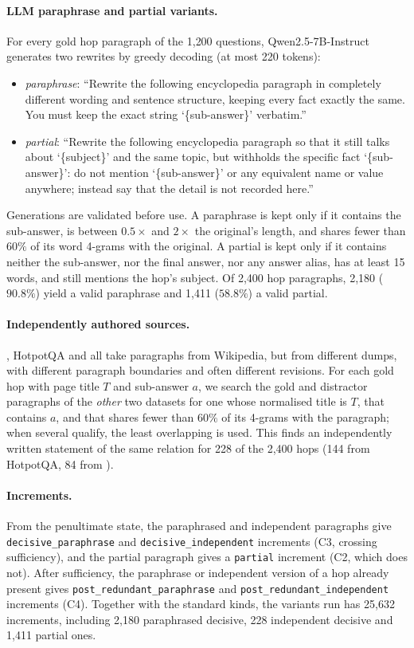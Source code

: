 \paragraph{LLM paraphrase and partial variants.} For every gold hop paragraph of the 1{,}200 questions, Qwen2.5-7B-Instruct generates two rewrites by greedy decoding (at most 220 tokens):
\begin{itemize}
  \item \emph{paraphrase}: ``Rewrite the following encyclopedia paragraph in completely different wording and sentence structure, keeping every fact exactly the same. You must keep the exact string `\{sub-answer\}' verbatim.''
  \item \emph{partial}: ``Rewrite the following encyclopedia paragraph so that it still talks about `\{subject\}' and the same topic, but withholds the specific fact `\{sub-answer\}': do not mention `\{sub-answer\}' or any equivalent name or value anywhere; instead say that the detail is not recorded here.''
\end{itemize}
Generations are validated before use. A paraphrase is kept only if it contains the sub-answer, is between $0.5\times$ and $2\times$ the original's length, and shares fewer than $60\%$ of its word 4-grams with the original. A partial is kept only if it contains neither the sub-answer, nor the final answer, nor any answer alias, has at least 15 words, and still mentions the hop's subject. Of 2{,}400 hop paragraphs, 2{,}180 ($90.8\%$) yield a valid paraphrase and 1{,}411 ($58.8\%$) a valid partial.

\paragraph{Independently authored sources.} \musique{}, HotpotQA and \twowiki{} all take paragraphs from Wikipedia, but from different dumps, with different paragraph boundaries and often different revisions. For each \musique{} gold hop with page title $T$ and sub-answer $a$, we search the gold and distractor paragraphs of the \emph{other} two datasets for one whose normalised title is $T$, that contains $a$, and that shares fewer than $60\%$ of its 4-grams with the \musique{} paragraph; when several qualify, the least overlapping is used. This finds an independently written statement of the same relation for 228 of the 2{,}400 hops (144 from HotpotQA, 84 from \twowiki{}).

\paragraph{Increments.} From the penultimate state, the paraphrased and independent paragraphs give \texttt{decisive\_paraphrase} and \texttt{decisive\_independent} increments (C3, crossing sufficiency), and the partial paragraph gives a \texttt{partial} increment (C2, which does not). After sufficiency, the paraphrase or independent version of a hop already present gives \texttt{post\_redundant\_paraphrase} and \texttt{post\_redundant\_independent} increments (C4). Together with the standard kinds, the variants run has 25{,}632 increments, including 2{,}180 paraphrased decisive, 228 independent decisive and 1{,}411 partial ones.

